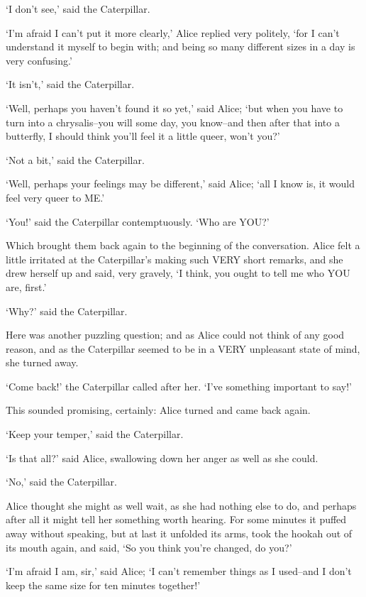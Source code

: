 \documentclass[12pt]{book}
\begin{document}
  `I don't see,' said the Caterpillar.

  `I'm afraid I can't put it more clearly,' Alice replied very
politely, `for I can't understand it myself to begin with; and
being so many different sizes in a day is very confusing.'

  `It isn't,' said the Caterpillar.

  `Well, perhaps you haven't found it so yet,' said Alice; `but
when you have to turn into a chrysalis--you will some day, you
know--and then after that into a butterfly, I should think you'll
feel it a little queer, won't you?'

  `Not a bit,' said the Caterpillar.

  `Well, perhaps your feelings may be different,' said Alice;
`all I know is, it would feel very queer to ME.'

  `You!' said the Caterpillar contemptuously.  `Who are YOU?'

  Which brought them back again to the beginning of the
conversation.  Alice felt a little irritated at the Caterpillar's
making such VERY short remarks, and she drew herself up and said,
very gravely, `I think, you ought to tell me who YOU are, first.'

  `Why?' said the Caterpillar.

  Here was another puzzling question; and as Alice could not
think of any good reason, and as the Caterpillar seemed to be in
a VERY unpleasant state of mind, she turned away.

  `Come back!' the Caterpillar called after her.  `I've something
important to say!'

  This sounded promising, certainly:  Alice turned and came back
again.

  `Keep your temper,' said the Caterpillar.

  `Is that all?' said Alice, swallowing down her anger as well as
she could.

  `No,' said the Caterpillar.

  Alice thought she might as well wait, as she had nothing else
to do, and perhaps after all it might tell her something worth
hearing.  For some minutes it puffed away without speaking, but
at last it unfolded its arms, took the hookah out of its mouth
again, and said, `So you think you're changed, do you?'

  `I'm afraid I am, sir,' said Alice; `I can't remember things as
I used--and I don't keep the same size for ten minutes together!'
\end{document}

